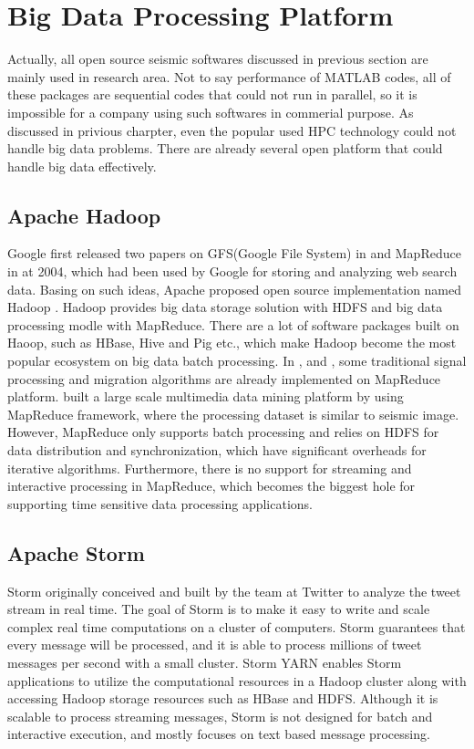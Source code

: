 \section{Big Data Processing Platform}
Actually, all open source seismic softwares discussed in previous section are mainly used in research area. Not to say performance of MATLAB codes, all of these packages are sequential codes that could not run in parallel, so it is impossible for a company using such softwares in commerial purpose. As discussed in privious charpter, even the popular used HPC technology could not handle big data problems. There are already several open platform that could handle big data effectively.

\subsection{Apache Hadoop}
Google first released two papers on GFS(Google File System) in \cite{GhemawatGFS945450} and MapReduce in \cite{DeanMSD1251264} at 2004, which had been used by Google for storing and analyzing web search data. Basing on such ideas, Apache proposed open source implementation named Hadoop \cite{ApacheHadoop}. Hadoop provides big data storage solution with HDFS and big data processing modle with MapReduce. There are a lot of software packages built on Haoop, such as HBase, Hive and Pig etc., which make Hadoop become the most popular ecosystem on big data batch processing. In \cite{2432874MohammadzaheriDISRAYMapReduce}, \cite{6118958RizvandiMapRecudePKTM} and \cite{2745578AddairSeismicSignalHadoop}, some traditional signal processing and migration algorithms are already implemented on MapReduce platform. \cite{6427595WangMultimediaMapReduce} built a large scale multimedia data mining platform by using MapReduce framework, where the processing dataset is similar to seismic image. However,  MapReduce only supports batch processing and relies on HDFS for data distribution and synchronization, which have significant overheads for iterative algorithms. Furthermore, there is no support for streaming and interactive processing in MapReduce, which becomes the biggest hole for supporting time sensitive data processing applications.

\subsection{Apache Storm}
Storm \cite{ApacheStorm} originally conceived and built by the team at Twitter to analyze the tweet stream in real time. The goal of Storm is to make it easy to write and scale complex real time computations on a cluster of computers. Storm guarantees that every message will be processed, and it is able to process millions of tweet messages per second with a small cluster. 
Storm YARN enables Storm applications to utilize the computational resources in a Hadoop cluster along with accessing Hadoop storage resources such as HBase\cite{ApacheHBase} and HDFS. Although it is scalable to process streaming messages, Storm is not designed for batch and interactive execution, and mostly focuses on text based message processing. 


